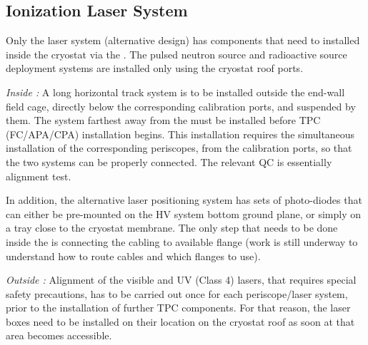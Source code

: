 


\subsection{Ionization Laser System} 
Only the laser system (alternative design) has components that need to installed inside the cryostat via the . The pulsed neutron source and radioactive source deployment systems are installed only using the cryostat roof ports.

\textit{Inside :} A long horizontal track system is to be installed outside the end-wall field cage, directly below the corresponding calibration ports, and suspended by them. The system farthest away from the  must be installed before TPC (FC/APA/CPA) installation begins. This installation requires the simultaneous installation of the corresponding periscopes, from the calibration ports, so that the two systems can be properly connected. The relevant QC is essentially alignment test.

In addition, the alternative laser positioning system has sets of photo-diodes that can either be pre-mounted on the HV system bottom ground plane, or simply on a tray close to the cryostat membrane. The only step that needs to be done inside the  is connecting the cabling to available flange (work is still underway to understand how to route cables and which flanges to use).

\textit{Outside :}  Alignment of the visible and UV (Class 4) lasers, that requires special safety precautions, has to be carried out once for each periscope/laser system, prior to the installation of further TPC components. For that reason, the laser boxes need to be installed on their location on the cryostat roof as soon at that area becomes accessible. 

